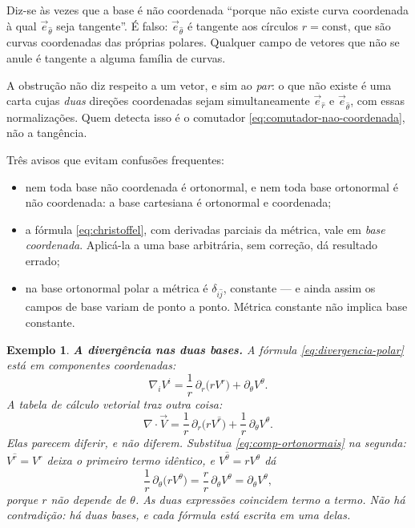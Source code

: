 \documentclass[12pt,a4paper,oneside]{book}
\theoremstyle{rgplain}
\newtheorem{example}{Exemplo}[chapter]
\theoremstyle{rgremark}
\begin{document}
\begin{atencao}[title={\sffamily\bfseries\footnotesize\color{rgTerracota}O ERRO ESTÁ EM ``TANGENTE''}]
Diz-se às vezes que a base é não coordenada ``porque não existe curva
coordenada à qual $\vec e_{\hat\theta}$ seja tangente''. É falso:
$\vec e_{\hat\theta}$ é tangente aos círculos $r=\text{const}$, que são curvas
coordenadas das próprias polares. Qualquer campo de vetores que não se anule é
tangente a alguma família de curvas.

A obstrução não diz respeito a um vetor, e sim ao \emph{par}: o que não existe é
uma carta cujas \emph{duas} direções coordenadas sejam simultaneamente
$\vec e_{\hat r}$ e $\vec e_{\hat\theta}$, com essas normalizações. Quem
detecta isso é o comutador \eqref{eq:comutador-nao-coordenada}, não a
tangência.
\end{atencao}

\begin{atencao}
Três avisos que evitam confusões frequentes:
\begin{itemize}
  \item nem toda base não coordenada é ortonormal, e nem toda base ortonormal
  é não coordenada: a base cartesiana é ortonormal e coordenada;
  \item a fórmula \eqref{eq:christoffel}, com derivadas parciais da métrica,
  vale em \emph{base coordenada}. Aplicá-la a uma base arbitrária, sem
  correção, dá resultado errado;
  \item na base ortonormal polar a métrica é $\delta_{\hat i\hat j}$,
  constante --- e ainda assim os campos de base variam de ponto a ponto.
  Métrica constante não implica base constante.
\end{itemize}
\end{atencao}

\begin{example}
\textbf{A divergência nas duas bases.} A fórmula
\eqref{eq:divergencia-polar} está em componentes coordenadas:
\[
  \nabla_iV^i=\frac1r\,\partial_r\bigl(rV^r\bigr)+\partial_\theta V^\theta .
\]
A tabela de cálculo vetorial traz outra coisa:
\[
  \nabla\cdot\vec V
  =\frac1r\,\partial_r\bigl(rV^{\hat r}\bigr)
  +\frac1r\,\partial_\theta V^{\hat\theta} .
\]
Elas parecem diferir, e não diferem. Substitua \eqref{eq:comp-ortonormais} na
segunda: $V^{\hat r}=V^r$ deixa o primeiro termo idêntico, e
$V^{\hat\theta}=rV^\theta$ dá
\[
  \frac1r\,\partial_\theta\bigl(rV^\theta\bigr)
  =\frac{r}{r}\,\partial_\theta V^\theta=\partial_\theta V^\theta ,
\]
porque $r$ não depende de $\theta$. As duas expressões coincidem termo a
termo. Não há contradição: há duas bases, e cada fórmula está escrita em uma
delas.
\end{example}
\end{document}
